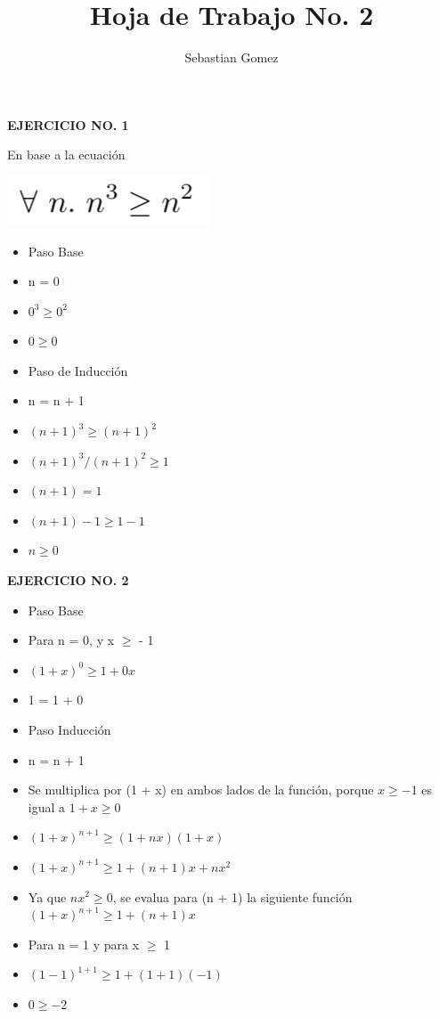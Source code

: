 \documentclass{article}
\begin{document}
\title{\textbf {Hoja de Trabajo No. 2}}
\author{Sebastian Gomez}
\maketitle

\begin{center}
\textbf{EJERCICIO NO. 1}
\end{center}

En base a la ecuación 

\includegraphics {EJERCICIO1T2.png}
\begin{itemize}
\item Paso Base
\item n = 0
\item $0^3\geq 0^2$
\item $0 \geq 0$
\item Paso de Inducción 
\item n = n + 1
\item $(n + 1)^3 \geq (n+1)^2$
\item $(n + 1)^3/(n + 1)^2 \geq 1$
\item $(n + 1) = 1$
\item $(n + 1) - 1 \geq 1 - 1$
\item $n \geq 0$
\end{itemize}

\begin{center}
\textbf {EJERCICIO NO. 2}
\end{center}
\begin{itemize}
\item Paso Base
\item Para n = 0, y x $\geq$ - 1 
\item $(1 + x)^0 \geq 1 + 0x$ 
\item 1 = 1 + 0
\item Paso Inducción
\item n = n + 1
\item Se multiplica por (1 + x) en ambos lados de la función, porque $x \geq -1$ es igual a $1 + x \geq 0$ 
\item $(1 + x)^{n+1} \geq (1 + nx)(1+x)$
\item $(1 + x)^{n+1} \geq 1 + (n + 1)x + nx^2$
\item Ya que $nx^2 \geq 0$, se evalua para (n + 1) la siguiente función $(1 + x)^{n+1} \geq 1 + (n + 1)x$
\item Para n = 1 y para x $\geq$ 1
\item $(1 - 1)^{1+1}\geq 1 + (1 + 1)(-1)$
\item $0 \geq -2$
\end{itemize}
\end{document}
